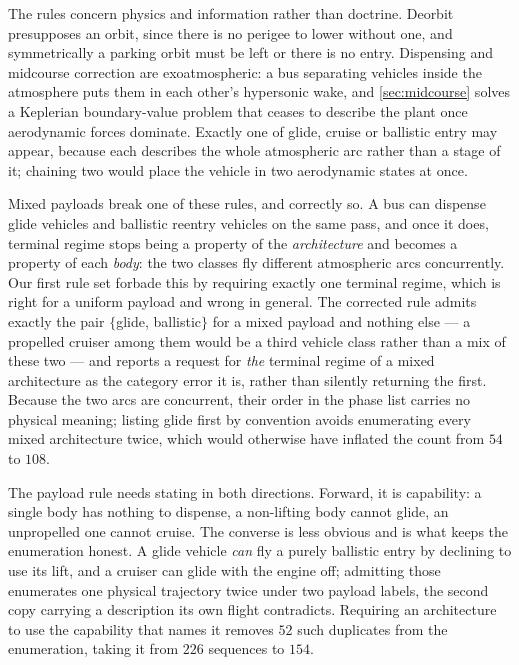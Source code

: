 \documentclass[11pt,a4paper]{article}
\theoremstyle{definition}
\numberwithin{equation}{section}
\begin{document}
The rules concern physics and information rather than doctrine. Deorbit presupposes an orbit, since there is no perigee to lower without one, and symmetrically a parking orbit must be left or there is no entry. Dispensing and midcourse correction are exoatmospheric: a bus separating vehicles inside the atmosphere puts them in each other's hypersonic wake, and \cref{sec:midcourse} solves a Keplerian boundary-value problem that ceases to describe the plant once aerodynamic forces dominate. Exactly one of glide, cruise or ballistic entry may appear, because each describes the whole atmospheric arc rather than a stage of it; chaining two would place the vehicle in two aerodynamic states at once.

Mixed payloads break one of these rules, and correctly so. A bus can dispense glide vehicles and ballistic reentry vehicles on the same pass, and once it does, terminal regime stops being a property of the \emph{architecture} and becomes a property of each \emph{body}: the two classes fly different atmospheric arcs concurrently. Our first rule set forbade this by requiring exactly one terminal regime, which is right for a uniform payload and wrong in general. The corrected rule admits exactly the pair $\{$glide, ballistic$\}$ for a mixed payload and nothing else --- a propelled cruiser among them would be a third vehicle class rather than a mix of these two --- and reports a request for \emph{the} terminal regime of a mixed architecture as the category error it is, rather than silently returning the first. Because the two arcs are concurrent, their order in the phase list carries no physical meaning; listing glide first by convention avoids enumerating every mixed architecture twice, which would otherwise have inflated the count from $54$ to $108$.

The payload rule needs stating in both directions. Forward, it is capability: a single body has nothing to dispense, a non-lifting body cannot glide, an unpropelled one cannot cruise. The converse is less obvious and is what keeps the enumeration honest. A glide vehicle \emph{can} fly a purely ballistic entry by declining to use its lift, and a cruiser can glide with the engine off; admitting those enumerates one physical trajectory twice under two payload labels, the second copy carrying a description its own flight contradicts. Requiring an architecture to use the capability that names it removes $52$ such duplicates from the enumeration, taking it from $226$ sequences to $154$.
\end{document}
